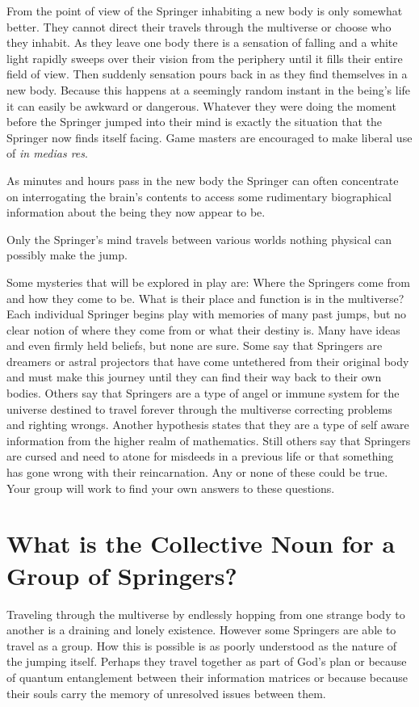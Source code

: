\documentclass[letterpaper,12pt,landscape,twocolumn]{book}
\begin{document}
From the point of view of the Springer inhabiting a new body is only
somewhat better. They cannot direct their travels through the
multiverse or choose who they inhabit. As they leave one body there is
a sensation of falling and a white light rapidly sweeps over their
vision from the periphery until it fills their entire field of
view. Then suddenly sensation pours back in as they find themselves in
a new body. Because this happens at a seemingly random instant in the
being's life it can easily be awkward or dangerous. Whatever they were
doing the moment before the Springer jumped into their mind is exactly
the situation that the Springer now finds itself facing. Game masters
are encouraged to make liberal use of \textit{in medias res}.

As minutes and hours pass in the new body the Springer can often
concentrate on interrogating the brain's contents to access some
rudimentary biographical information about the being they now appear
to be.

Only the Springer's mind travels between various worlds nothing
physical can possibly make the jump. 

Some mysteries that will be explored in play are: Where the Springers come
from and how they come to be. What is their place and function is in
the multiverse? Each individual Springer begins play with memories of
many past jumps, but no clear notion of where they come from or what
their destiny is. Many have ideas and even firmly held beliefs, but
none are sure. Some say that Springers are dreamers or astral
projectors that have come untethered from their original body and
must make this journey until they can find their way back to their own
bodies. Others say that Springers are a type of angel or immune system
for the universe destined to travel forever through the multiverse
correcting problems and righting wrongs. Another hypothesis states
that they are a type of self aware information from the higher realm
of mathematics. Still others say that Springers are cursed and need to
atone for misdeeds in a previous life or that something has gone wrong
with their reincarnation. Any or none of these could be true. Your
group will work to find your own answers to these questions.

\section{What is the Collective Noun for a Group of Springers?}

Traveling through the multiverse by endlessly hopping from one strange
body to another is a draining and lonely existence. However some
Springers are able to travel as a group. How this is possible is as
poorly understood as the nature of the jumping itself. Perhaps they
travel together as part of God's plan or because of quantum
entanglement between their information matrices or because because
their souls carry the memory of unresolved issues between them.
\end{document}
